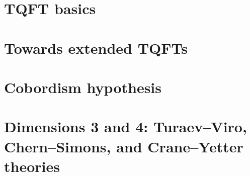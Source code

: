 \documentclass{book}
\theoremstyle{plain}
\numberwithin{equation}{section}
\numberwithin{table}{section}
\numberwithin{figure}{section}
\begin{document}
%
\part{TQFT basics}\label{p:basic-definitions}








\part{Towards extended TQFTs}\label{p:2d}









\part{Cobordism hypothesis}\label{p:cobordism-hypothesis}




\part{Dimensions 3 and 4: Turaev--Viro, Chern--Simons, and Crane--Yetter theories}\label{p:tensor-categories}






\end{document}
